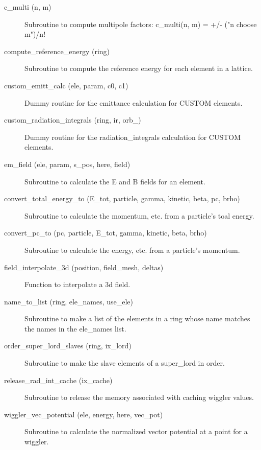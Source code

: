 \begin{description}

\item[c\_multi (n, m)] \Newline
Subroutine to compute multipole factors: 
c\_multi(n, m) = +/- ("n choose m")/n! 

\item[compute\_reference\_energy (ring)] \Newline
Subroutine to compute the reference energy for each element in a lattice. 

\item[custom\_emitt\_calc (ele, param, c0, c1)] \Newline
Dummy routine for the emittance calculation for CUSTOM elements. 

\item[custom\_radiation\_integrals (ring, ir, orb\_)] \Newline
Dummy routine for the radiation\_integrals calculation for CUSTOM elements. 

\item[em\_field (ele, param, s\_pos, here, field)] \Newline
Subroutine to calculate the E and B fields for an element. 

\item[convert\_total\_energy\_to (E\_tot, particle, gamma, kinetic, beta, pc, brho)] \Newline
Subroutine to calculate the momentum, etc. from a particle's toal energy. 

\item[convert\_pc\_to (pc, particle, E\_tot, gamma, kinetic, beta, brho)] \Newline
Subroutine to calculate the energy, etc. from a particle's momentum. 

\item[field\_interpolate\_3d (position, field\_mesh, deltas)] \Newline
Function to interpolate a 3d field. 

\item[name\_to\_list (ring, ele\_names, use\_ele)] \Newline
Subroutine to make a list of the elements in a ring 
whose name matches the names in the ele\_names list. 

\item[order\_super\_lord\_slaves (ring, ix\_lord)] \Newline
Subroutine to make the slave elements of a super\_lord in order. 

\item[release\_rad\_int\_cache (ix\_cache)] \Newline 
     Subroutine to release the memory associated with caching wiggler values.

\item[wiggler\_vec\_potential (ele, energy, here, vec\_pot)] \Newline
Subroutine to calculate the normalized vector potential at a point for a wiggler.

\end{description}

